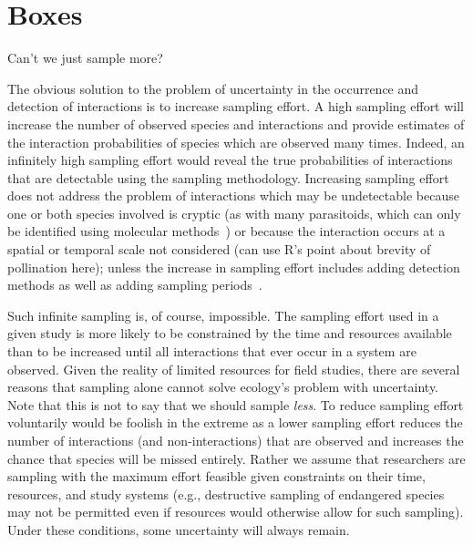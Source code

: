 \documentclass[12pt]{article}
\begin{document}

\section*{Boxes}

Can't we just sample more?

The obvious solution to the problem of uncertainty in the occurrence and detection of interactions is to increase sampling effort. A high sampling effort will increase the number of observed species and interactions and provide estimates of the interaction probabilities of species which are observed many times. Indeed, an infinitely high sampling effort would reveal the true probabilities of interactions that are detectable using the sampling methodology. Increasing sampling effort does not address the problem of interactions which may be undetectable because one or both species involved is cryptic (as with many parasitoids, which can only be identified using molecular methods~\citep{Carol,Wirta}) or because the interaction occurs at a spatial or temporal scale not considered (can use R's point about brevity of pollination here); unless the increase in sampling effort includes adding detection methods as well as adding sampling periods~\citep{Tomas}. 


Such infinite sampling is, of course, impossible. The sampling effort used in a given study is more likely to be constrained by the time and resources available than to be increased until all interactions that ever occur in a system are observed. Given the reality of limited resources for field studies, there are several reasons that sampling alone cannot solve ecology's problem with uncertainty. Note that this is not to say that we should sample \emph{less}. To reduce sampling effort voluntarily would be foolish in the extreme as a lower sampling effort reduces the number of interactions (and non-interactions) that are observed and increases the chance that species will be missed entirely. Rather we assume that researchers are sampling with the maximum effort feasible given constraints on their time, resources, and study systems (e.g., destructive sampling of endangered species may not be permitted even if resources would otherwise allow for such sampling). Under these conditions, some uncertainty will always remain.
\end{document}
